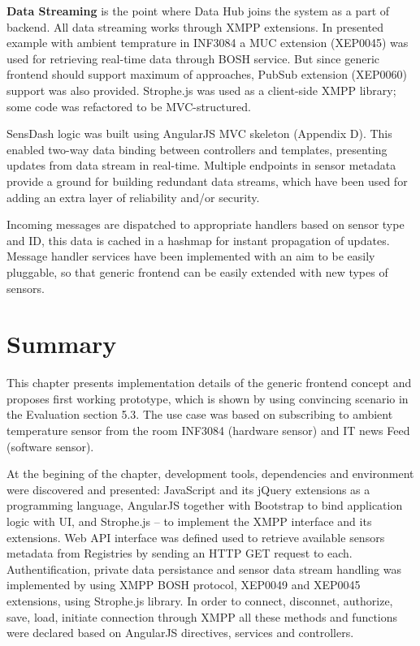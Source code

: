 \textbf{Data Streaming} is the point where Data Hub joins the system as a part of backend. All data streaming works through XMPP extensions. In presented example with ambient temprature in INF3084 a MUC extension (XEP0045) was used for retrieving real-time data through BOSH service. But since generic frontend should support maximum of approaches, PubSub extension (XEP0060) support was also provided. Strophe.js was used as a client-side XMPP library; some code was refactored to be MVC-structured.

SensDash logic was built using AngularJS MVC skeleton (Appendix D). This enabled two-way data binding between controllers and templates, presenting updates from data stream in real-time. Multiple endpoints in sensor metadata provide a ground for building redundant data streams, which have been used for adding an extra layer of reliability and/or security. 

Incoming messages are dispatched to appropriate handlers based on sensor type and ID, this data is cached in a hashmap for instant propagation of updates. Message handler services have been implemented with an aim to be easily pluggable, so that generic frontend can be easily extended with new types of sensors.

\section{Summary}
This chapter presents implementation details of the generic frontend concept and proposes first working prototype, which is shown by using convincing scenario in the Evaluation section 5.3. The use case was based on subscribing to ambient temperature sensor from the room INF3084 (hardware sensor) and IT news Feed (software sensor).

At the begining of the chapter, development tools, dependencies and environment were discovered and presented: JavaScript and its jQuery extensions as a programming language, AngularJS together with Bootstrap to bind application logic with UI, and Strophe.js -- to implement the XMPP interface and its extensions. Web API interface was defined used to retrieve available sensors metadata from Registries by sending an HTTP GET request to each. Authentification, private data persistance and sensor data stream handling was implemented by using XMPP BOSH protocol, XEP0049 and XEP0045 extensions, using Strophe.js library. In order to connect, disconnet, authorize, save, load, initiate connection through XMPP all these methods and functions were declared based on AngularJS directives, services and controllers.

